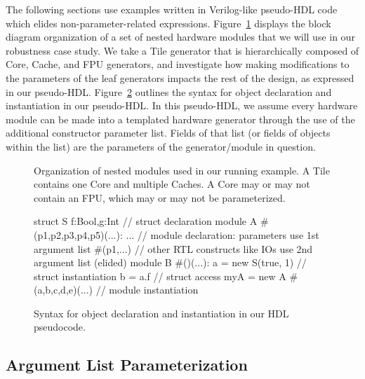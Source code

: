 The following sections use examples written in Verilog-like pseudo-HDL code which elides non-parameter-related expressions.
Figure~\ref{fig:block} displays the block diagram organization of a set of nested hardware modules that we will use in our robustness case study.
We take a Tile generator that is hierarchically composed of Core, Cache, and FPU generators, and investigate how making modifications to the parameters
of the leaf generators impacts the rest of the design, as expressed in our pseudo-HDL.
Figure~\ref{fig:phdl} outlines the syntax for object declaration and instantiation in our pseudo-HDL.
In this pseudo-HDL, we assume every hardware module can be made into a templated hardware generator through the use of the additional \code{\#()} constructor parameter list.
Fields of that list (or fields of objects within the list) are the parameters of the generator/module in question.

\begin{figure}
\centering
{}
\caption{Organization of nested modules used in our running example.
A Tile contains one Core and multiple Caches.
A Core may or may not contain an FPU, which may or may not be parameterized.}
\label{fig:block}
\end{figure}

\begin{figure}
\centering
\begin{phdl}
struct S {f:Bool,g:Int}          // struct declaration
module A #(p1,p2,p3,p4,p5)(...): ... 
   // module declaration: parameters use 1st argument list #(p1,...)
   // other RTL constructs like IOs use 2nd argument list (elided)
module B #()(...):
  a = new S(true, 1)             // struct instantiation
  b = a.f                        // struct access
  myA = new A #(a,b,c,d,e)(...)  // module instantiation
\end{phdl} 
\caption{Syntax for object declaration and instantiation in our HDL pseudocode.}
\label{fig:phdl}
\end{figure}

\subsection{Argument List Parameterization}

